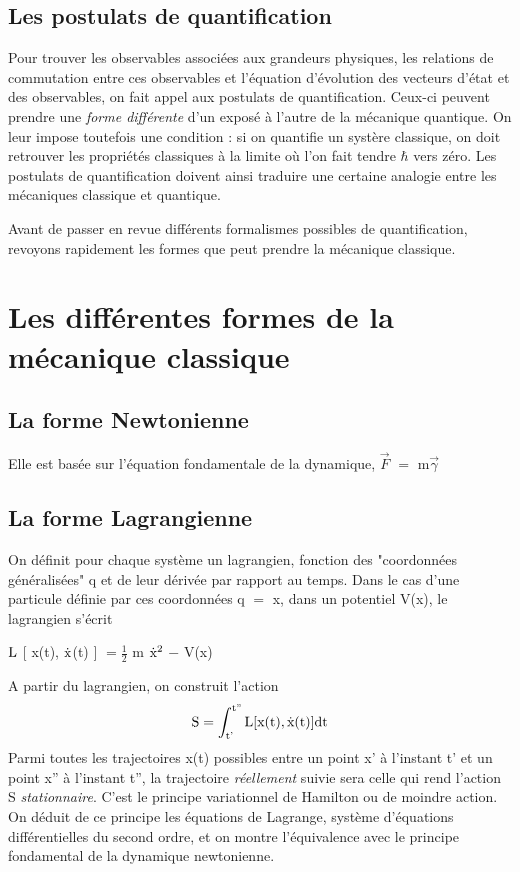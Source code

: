 \subsection{Les postulats de quantification}
Pour trouver les observables associées aux grandeurs physiques,
les relations de commutation entre
ces observables et l'équation d'évolution des vecteurs d'état et des
observables, on fait appel aux postulats de quantification. Ceux-ci
peuvent prendre une {\it forme différente} d'un exposé à l'autre de la
mécanique quantique. On leur impose toutefois une condition : si on
quantifie un systère classique, on doit retrouver les propriétés classiques
à la limite où l'on fait tendre $\hbar$ vers zéro. Les postulats de
quantification doivent ainsi traduire une certaine analogie entre les
mécaniques classique et quantique.

Avant de passer en revue différents formalismes possibles de
quantification, revoyons rapidement les formes que peut prendre la
mécanique classique.
\section{Les différentes formes de la mécanique classique}

\subsection{La forme Newtonienne}
Elle est basée sur l'équation fondamentale de la dynamique, $\vec{F}$ $=$ m$\vec{\gamma}$

\subsection{La forme Lagrangienne}
On définit pour chaque système un lagrangien,
fonction des "coordonnées généralisées" q et de leur dérivée par rapport
au temps. Dans le cas d'une particule définie par ces coordonnées q $=$ x,
dans un potentiel V(x), le lagrangien s'écrit

\begin{center}
$\text{L}$ $[$ x(t), $\dot{\text{x}}$(t) $]$ $= \frac{1}{2}$ m $\dot{\text{x}}^2$ $-$ V(x) 
\end{center}
A partir du lagrangien, on construit l'action
\[
\text{S} = \int_{\text{t'}}^{\text{t''}} \text{L} [ \text{x(t)}, \dot{\text{\text{x}}}\text{(t)} ] \text{dt}
\]
Parmi toutes les trajectoires x(t) possibles entre un point
x' à l'instant t' et un point x'' à l'instant t'', la trajectoire {\it réellement} suivie sera celle qui rend l'action S {\it stationnaire}. C'est le principe variationnel de Hamilton ou de moindre action. On déduit de ce
principe les équations de Lagrange, système d'équations différentielles
du second ordre, et on montre l'équivalence avec le principe fondamental
de la dynamique newtonienne.

